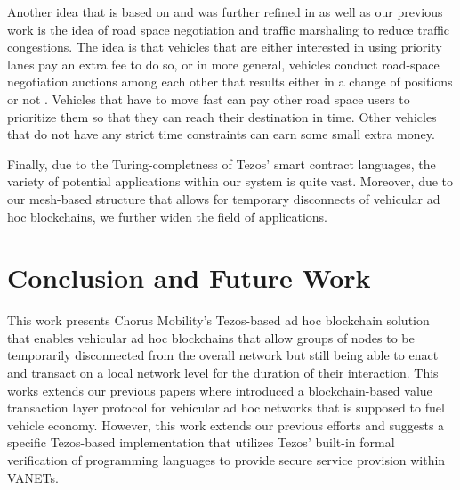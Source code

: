 \documentclass{llncs}
\begin{document}
{		Another idea that is based on\cite{leiding2016self} and was further refined in \cite{macneille2018vehicle} as well as our previous work \cite{chorusWhitepaper}\cite{chorus2018MCIS} is the idea of road space negotiation and traffic marshaling to reduce traffic congestions. The idea is that vehicles that are either interested in using priority lanes \cite{macneille2018vehicle} pay an extra fee to do so, or in more general, vehicles conduct road-space negotiation auctions among each other that results either in a change of positions or not \cite{leiding2016self}\cite{chorusWhitepaper}\cite{chorus2018MCIS}. Vehicles that have to move fast can pay other road space users to prioritize them so that they can reach their destination in time. Other vehicles that do not have any strict time constraints can earn some small extra money.
		
		Finally, due to the Turing-completness of Tezos' smart contract languages, the variety of potential applications within our system is quite vast. Moreover, due to our mesh-based structure that allows for temporary disconnects of vehicular ad hoc blockchains, we further widen the field of applications. 
		

	\section{Conclusion and Future Work}
		\label{s:section-6}	




		This work presents Chorus Mobility's Tezos-based ad hoc blockchain solution that enables vehicular ad hoc blockchains that allow groups of nodes to be temporarily disconnected from the overall network but still being able to enact and transact on a local network level for the duration of their interaction. This works extends our previous papers \cite{chorusWhitepaper}\cite{chorus2018MCIS} where introduced a blockchain-based value transaction layer protocol for vehicular ad hoc networks that is supposed to fuel vehicle economy. However, this work extends our previous efforts and suggests a specific Tezos-based implementation that utilizes Tezos' built-in formal verification of programming languages to provide secure service provision within VANETs.

}
\end{document}
